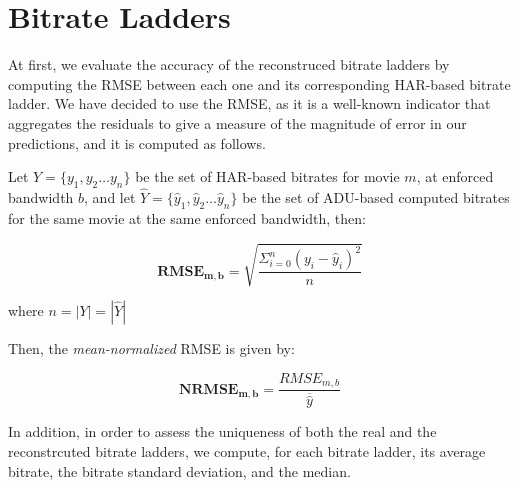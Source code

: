 
\section{Bitrate Ladders}

At first, we evaluate the accuracy of the reconstruced bitrate ladders by computing the RMSE between each one and its corresponding HAR-based bitrate ladder. We have decided to use the RMSE, as it is a well-known indicator that aggregates the residuals to give a measure of the magnitude of error in our predictions, and it is computed as follows.

Let $Y=\{y_1, y_2 \dots y_n\}$ be the set of HAR-based bitrates for movie $m$, at enforced bandwidth
$b$, and let $\hat{Y}=\{\hat{y}_1, \hat{y}_2 \dots \hat{y}_n\}$ be the set of ADU-based computed bitrates for the same
movie at the same enforced bandwidth, then:

\begin{equation*}
    \mathbf{RMSE_{m, b}} = \sqrt{\dfrac{\Sigma_{i=0}^{n}(y_i - \hat{y}_i)^2}{n}}
\end{equation*}

where $n = |Y| = |\hat{Y}|$

Then, the \emph{mean-normalized} RMSE is given by:

\begin{equation*}
    \mathbf{NRMSE_{m, b}} = \dfrac{RMSE_{m, b}}{\overline{\hat{y}}}
\end{equation*}

In addition, in order to assess the uniqueness of both the real and the
reconstrcuted bitrate ladders, we compute, for each bitrate ladder, its average
bitrate, the bitrate standard deviation, and the median.

